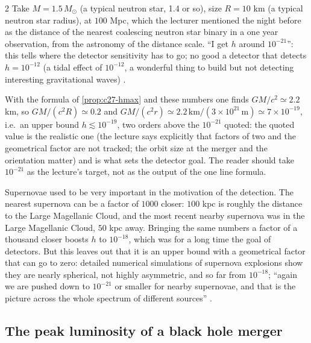 \begin{paracol}{2}
Take $M=1.5\,M_\odot$ (a typical neutron star, 1.4 or so), size $R=10$ km (a typical neutron star radius), at $100$ Mpc, which the lecturer mentioned the night before as the distance of the nearest coalescing neutron star binary in a one year observation, from the astronomy of the distance scale. ``I get $h$ around $10^{-21}$'': this tells where the detector sensitivity has to go; no good a detector that detects $h=10^{-12}$ (a tidal effect of $10^{-12}$, a wonderful thing to build but not detecting interesting gravitational waves) .

\begin{coursenote}
With the formula of \cref{prop:c27-hmax} and these numbers one finds $GM/c^2\simeq2.2$ km, so $GM/(c^2R)\simeq0.2$ and $GM/(c^2r)\simeq2.2\,\mathrm{km}/(3\times10^{21}\,\mathrm{m})\simeq7\times10^{-19}$, i.e.\ an upper bound $h\lesssim10^{-19}$, two orders above the $10^{-21}$ quoted: the quoted value is the realistic one (the lecture says explicitly that factors of two and the geometrical factor are not tracked; the orbit size at the merger and the orientation matter) and is what sets the detector goal. The reader should take $10^{-21}$ as the lecture's target, not as the output of the one line formula.
\end{coursenote}

Supernovae used to be very important in the motivation of the detection. The nearest supernova can be a factor of $1000$ closer: $100$ kpc is roughly the distance to the Large Magellanic Cloud, and the most recent nearby supernova was in the Large Magellanic Cloud, $50$ kpc away. Bringing the same numbers a factor of a thousand closer boosts $h$ to $10^{-18}$, which was for a long time the goal of detectors. But this leaves out that it is an upper bound with a geometrical factor that can go to zero: detailed numerical simulations of supernova explosions show they are nearly spherical, not highly asymmetric, and so far from $10^{-18}$; ``again we are pushed down to $10^{-21}$ or smaller for nearby supernovae, and that is the picture across the whole spectrum of different sources'' .

\subsection{The peak luminosity of a black hole merger}


\end{paracol}
